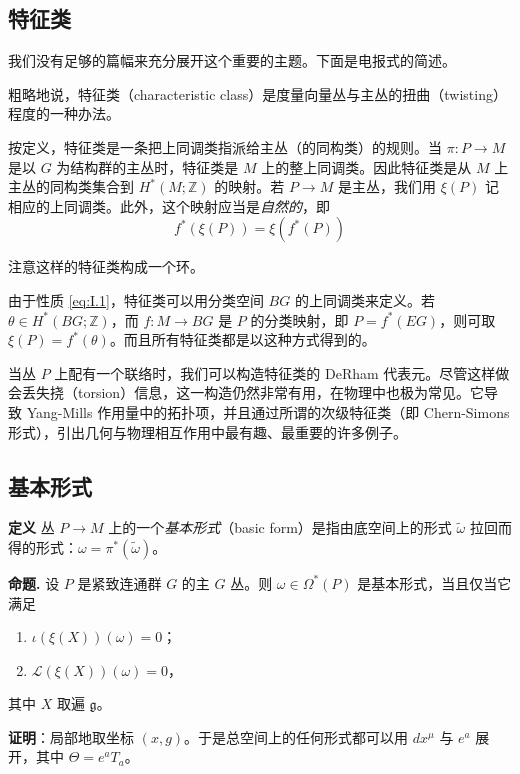 \subsection{特征类} %

我们没有足够的篇幅来充分展开这个重要的主题。下面是电报式的简述。

粗略地说，特征类（characteristic class）是度量向量丛与主丛的扭曲（twisting）程度的一种办法。

按定义，特征类是一条把上同调类指派给主丛（的同构类）的规则。当 $\pi: P\to M$ 是以 $G$ 为结构群的主丛时，特征类是 $M$ 上的整上同调类。因此特征类是从 $M$ 上主丛的同构类集合到 $H^*(M;\mathbb{Z})$ 的映射。若 $P\to M$ 是主丛，我们用 $\xi(P)$ 记相应的上同调类。此外，这个映射应当是\emph{自然的}，即
\begin{equation}
  f^*(\xi(P)) = \xi(f^*(P))
  \tag{I.1}
  \label{eq:I.1}
\end{equation}

注意这样的特征类构成一个环。

由于性质 \eqref{eq:I.1}，特征类可以用分类空间 $BG$ 的上同调类来定义。若 $\theta\in H^*(BG;\mathbb{Z})$，而 $f: M\to BG$ 是 $P$ 的分类映射，即 $P=f^*(EG)$，则可取 $\xi(P)=f^*(\theta)$。而且所有特征类都是以这种方式得到的。

当丛 $P$ 上配有一个联络时，我们可以构造特征类的 DeRham 代表元。尽管这样做会丢失挠（torsion）信息，这一构造仍然非常有用，在物理中也极为常见。它导致 Yang-Mills 作用量中的拓扑项，并且通过所谓的次级特征类（即 Chern-Simons 形式），引出几何与物理相互作用中最有趣、最重要的许多例子。

\subsection{基本形式} %

\textbf{定义} 丛 $P\to M$ 上的一个\emph{基本形式}（basic form）是指由底空间上的形式 $\tilde{\omega}$ 拉回而得的形式：$\omega=\pi^*(\tilde{\omega})$。

\textbf{命题.} 设 $P$ 是紧致连通群 $G$ 的主 $G$ 丛。则 $\omega\in\Omega^*(P)$ 是基本形式，当且仅当它满足
\begin{enumerate}[label=(\alph*)]
  \item $\iota(\xi(X))(\omega)=0$；
  \item $\mathcal{L}(\xi(X))(\omega)=0$，
\end{enumerate}
其中 $X$ 取遍 $\mathfrak{g}$。

\textbf{证明}：局部地取坐标 $(x,g)$。于是总空间上的任何形式都可以用 $dx^\mu$ 与 $e^a$ 展开，其中 $\Theta=e^aT_a$。

